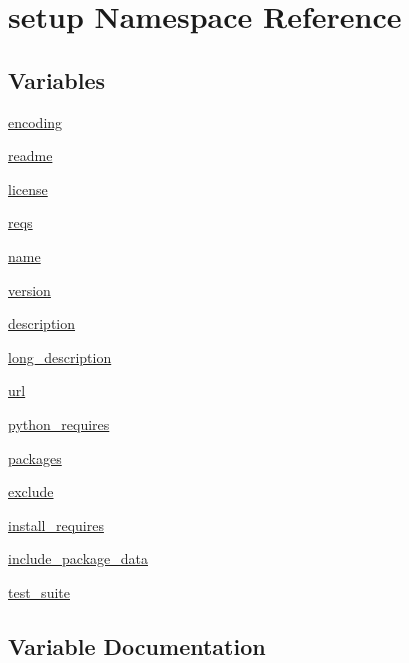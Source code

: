 \hypertarget{namespacesetup}{}\section{setup Namespace Reference}
\label{namespacesetup}
\subsection*{Variables}
\begin{DoxyCompactItemize}
\item 
\hyperlink{namespacesetup_a443be2d01fd539bf6761aff70724d876}{encoding}
\item 
\hyperlink{namespacesetup_af307481f158da7b58a33229df5e30c6c}{readme}
\item 
\hyperlink{namespacesetup_a8ed6f50a28bd6a8794f8e1153baa6de9}{license}
\item 
\hyperlink{namespacesetup_a0c29631fa586cf133cd55999a817f46b}{reqs}
\item 
\hyperlink{namespacesetup_ab3a7a0638d76a01367c5bc3cc699447f}{name}
\item 
\hyperlink{namespacesetup_a2aa722b36a933088812b50ea79b97a5c}{version}
\item 
\hyperlink{namespacesetup_aedf461ec52a946bda975938ba0b93ec0}{description}
\item 
\hyperlink{namespacesetup_a4cda9dbfb952875376a0749fe08a5bde}{long\+\_\+description}
\item 
\hyperlink{namespacesetup_afc13124aa5c0124e84e1d965e3f4b0fb}{url}
\item 
\hyperlink{namespacesetup_aa7ca7bc9391b217e81efeb03689d8dbf}{python\+\_\+requires}
\item 
\hyperlink{namespacesetup_aff2375a361fd5865c77bd9aa093be747}{packages}
\item 
\hyperlink{namespacesetup_a49b34d9a29763a7757a7cb00821e651d}{exclude}
\item 
\hyperlink{namespacesetup_abead4f26b530856f858f0d44c7cf2588}{install\+\_\+requires}
\item 
\hyperlink{namespacesetup_a35139105b25ef46629d31888bad595d8}{include\+\_\+package\+\_\+data}
\item 
\hyperlink{namespacesetup_afd7a7f31bfa5027bfe335aedfcc1b70e}{test\+\_\+suite}
\end{DoxyCompactItemize}


\subsection{Variable Documentation}
\mbox{\label{namespacesetup_aedf461ec52a946bda975938ba0b93ec0}} 

